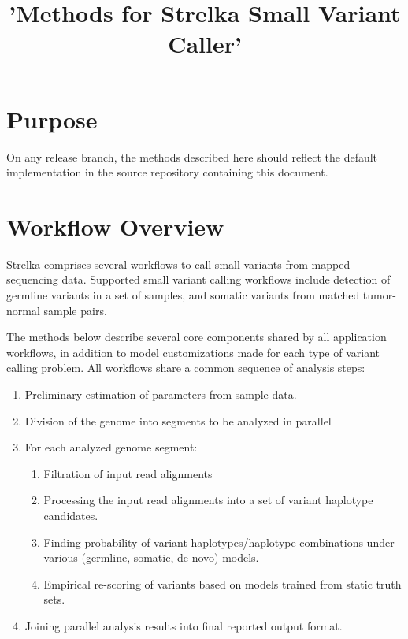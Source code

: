 \documentclass{article}
\title{'Methods for Strelka Small Variant Caller'}
\begin{document}
\maketitle

\tableofcontents



\section{Purpose}

On any release branch, the methods described here should reflect the default implementation in the source repository containing this document.



\section{Workflow Overview}

Strelka comprises several workflows to call small variants from mapped sequencing data. Supported small variant calling workflows include detection of germline variants in a set of samples, and somatic variants from matched tumor-normal sample pairs.

The methods below describe several core components shared by all application workflows, in addition to model customizations made for each type of variant calling problem. All workflows share a common sequence of analysis steps:

\begin{enumerate}
\item Preliminary estimation of parameters from sample data.
\item Division of the genome into segments to be analyzed in parallel
\item For each analyzed genome segment:
\begin{enumerate}
\item Filtration of input read alignments
\item Processing the input read alignments into a set of variant haplotype candidates.
\item Finding probability of variant haplotypes/haplotype combinations under various (germline, somatic, de-novo) models.
\item Empirical re-scoring of variants based on models trained from static truth sets.
\end{enumerate}
\item Joining parallel analysis results into final reported output format.
\end{enumerate}
\end{document}
